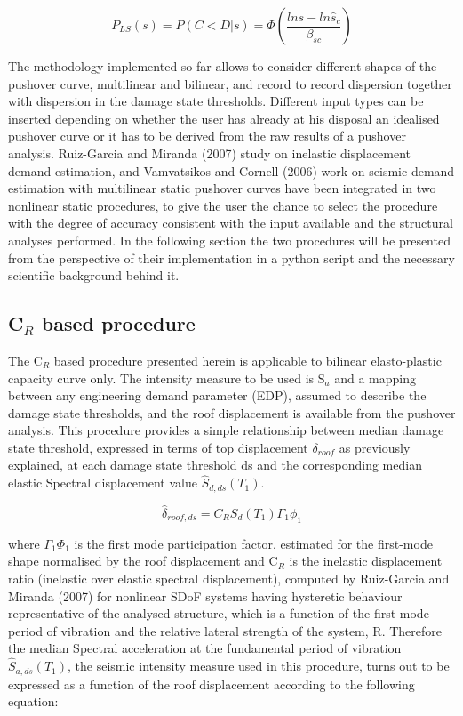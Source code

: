 \begin{equation}
P_{LS}(s) = P(C < D | s) = \Phi(\frac{ln s -ln \hat{s}_c}{\beta_{sc}})
\end{equation}

The methodology implemented so far allows to consider different shapes of the pushover curve, multilinear and bilinear, and record to record dispersion together with dispersion in the damage state thresholds. Different input types can be inserted depending on whether the user has already at his disposal an idealised pushover curve or it has to be derived from the raw results of a pushover analysis. Ruiz-Garcia and Miranda (2007) study on inelastic displacement demand estimation, and Vamvatsikos and Cornell (2006) work on seismic demand estimation with multilinear static pushover curves have been integrated in two nonlinear static procedures, to give the user the chance to select the procedure with the degree of accuracy consistent with the input available and the structural analyses performed. In the following section the two procedures will be presented from the perspective of their implementation in a python script and the necessary scientific background behind it.

\subsection{C$_R$ based procedure}

The C$_R$ based procedure presented herein is applicable to bilinear elasto-plastic capacity curve only. The intensity measure to be used is S$_a$ and a mapping between any engineering demand parameter (EDP), assumed to describe the damage state thresholds, and the roof displacement is available from the pushover analysis. This procedure provides a simple relationship between median damage state threshold, expressed in terms of top displacement $\delta_{roof}$ as previously explained, at each damage state threshold ds and the corresponding median elastic Spectral displacement value $\hat{S}_{d,ds}(T_1)$.

\begin{equation}
\hat{\delta}_{roof, ds} = C_R S_d(T_1) \Gamma_1 \phi_1
\end{equation}

where $\Gamma_1 \Phi_1$ is the first mode participation factor, estimated for the first-mode shape normalised by the roof displacement and C$_R$ is the inelastic displacement ratio (inelastic over elastic spectral displacement), computed by Ruiz-Garcia and Miranda (2007) for nonlinear SDoF systems having hysteretic behaviour representative of the analysed structure, which is a function of the first-mode period of vibration and the relative lateral strength of the system, R. Therefore the median Spectral acceleration at the fundamental period of vibration $\hat{S}_{a,ds}(T_1)$, the seismic intensity measure used in this procedure, turns out to be expressed as a function of the roof displacement according to the following equation:

